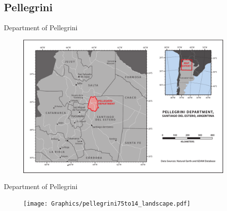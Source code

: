 \documentclass[  compress,xcolor={usenames,dvipsnames}]{beamer}
\newcommand{\datenoyear}[2]{%
  \noyear\formatdate{#1}{#2}{1}%
  \aagdate}
\begin{document}


\subsection{Pellegrini}
\begin{frame}{Department of Pellegrini}
  \begin{figure}
    \includegraphics[width=0.97\textwidth]{Graphics/argentinaOverview_landscape.pdf}
  \end{figure}
\end{frame}

\begin{frame}{Department of Pellegrini}
  \begin{figure}
    \texttt{[image: Graphics/pellegrini75to14\_landscape.pdf]}
  \end{figure}
\end{frame}
\end{document}
